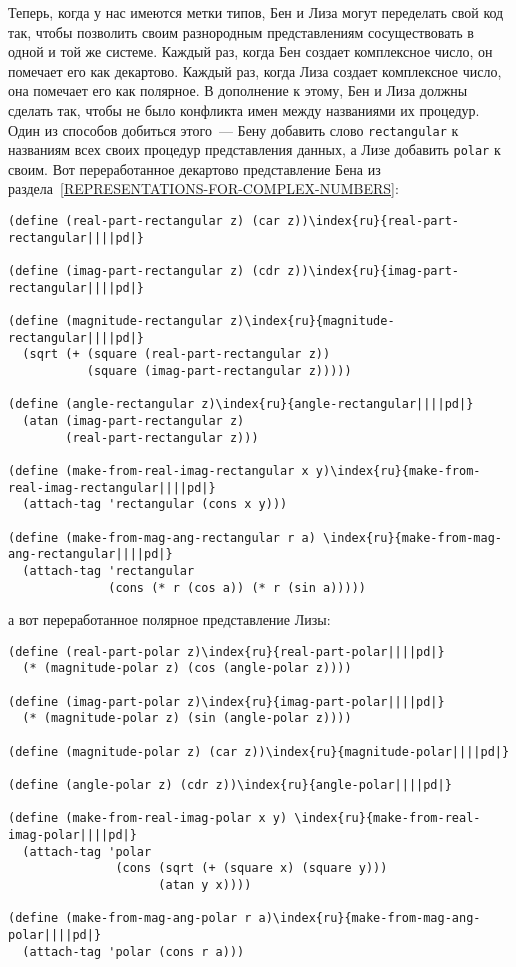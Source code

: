 Теперь, когда у нас имеются метки типов, Бен и Лиза 
могут переделать свой код так, чтобы позволить своим разнородным
представлениям сосуществовать в одной и той же системе.  Каждый раз,
когда Бен создает комплексное число, он помечает его как декартово.
Каждый раз, когда Лиза создает комплексное число, она помечает его
как полярное.  В дополнение к этому, Бен и Лиза должны сделать так,
чтобы не было конфликта имен между названиями их процедур.  Один из
способов добиться этого~--- Бену добавить слово {\tt rectangular} к
названиям всех своих процедур представления данных, а Лизе добавить
{\tt polar} к своим.  Вот переработанное декартово представление 
Бена
из раздела~\ref{REPRESENTATIONS-FOR-COMPLEX-NUMBERS}:

\begin{Verbatim}[fontsize=\small]
(define (real-part-rectangular z) (car z))\index{ru}{real-part-rectangular||||pd|}

(define (imag-part-rectangular z) (cdr z))\index{ru}{imag-part-rectangular||||pd|}

(define (magnitude-rectangular z)\index{ru}{magnitude-rectangular||||pd|}
  (sqrt (+ (square (real-part-rectangular z))
           (square (imag-part-rectangular z)))))

(define (angle-rectangular z)\index{ru}{angle-rectangular||||pd|}
  (atan (imag-part-rectangular z)
        (real-part-rectangular z)))

(define (make-from-real-imag-rectangular x y)\index{ru}{make-from-real-imag-rectangular||||pd|}
  (attach-tag 'rectangular (cons x y)))

(define (make-from-mag-ang-rectangular r a) \index{ru}{make-from-mag-ang-rectangular||||pd|}
  (attach-tag 'rectangular
              (cons (* r (cos a)) (* r (sin a)))))
\end{Verbatim}
а вот переработанное полярное представление Лизы:

\begin{Verbatim}[fontsize=\small]
(define (real-part-polar z)\index{ru}{real-part-polar||||pd|}
  (* (magnitude-polar z) (cos (angle-polar z))))

(define (imag-part-polar z)\index{ru}{imag-part-polar||||pd|}
  (* (magnitude-polar z) (sin (angle-polar z))))

(define (magnitude-polar z) (car z))\index{ru}{magnitude-polar||||pd|}

(define (angle-polar z) (cdr z))\index{ru}{angle-polar||||pd|}

(define (make-from-real-imag-polar x y) \index{ru}{make-from-real-imag-polar||||pd|}
  (attach-tag 'polar
               (cons (sqrt (+ (square x) (square y)))
                     (atan y x))))

(define (make-from-mag-ang-polar r a)\index{ru}{make-from-mag-ang-polar||||pd|}
  (attach-tag 'polar (cons r a)))
\end{Verbatim}

